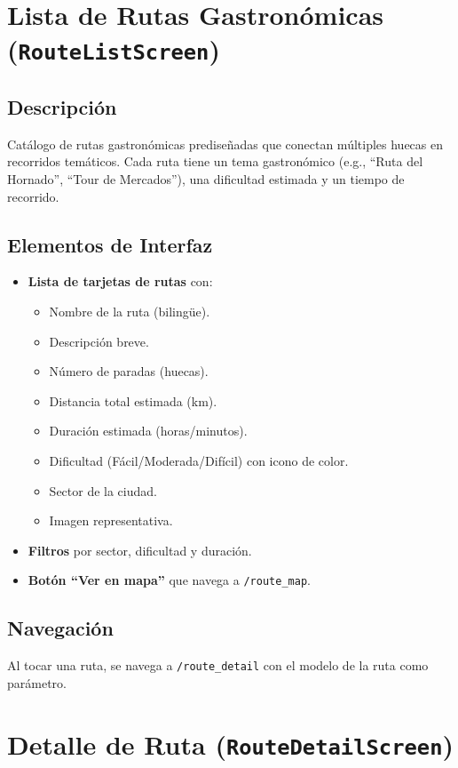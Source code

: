 \documentclass[11pt, a4paper, oneside]{report}
\begin{document}
\section{Lista de Rutas Gastronómicas (\texttt{RouteListScreen})}

\subsection{Descripción}
Catálogo de rutas gastronómicas prediseñadas que conectan múltiples huecas en recorridos temáticos. Cada ruta tiene un tema gastronómico (e.g., ``Ruta del Hornado'', ``Tour de Mercados''), una dificultad estimada y un tiempo de recorrido.

\subsection{Elementos de Interfaz}
\begin{itemize}
  \item \textbf{Lista de tarjetas de rutas} con:
  \begin{itemize}
    \item Nombre de la ruta (bilingüe).
    \item Descripción breve.
    \item Número de paradas (huecas).
    \item Distancia total estimada (km).
    \item Duración estimada (horas/minutos).
    \item Dificultad (Fácil/Moderada/Difícil) con icono de color.
    \item Sector de la ciudad.
    \item Imagen representativa.
  \end{itemize}
  \item \textbf{Filtros} por sector, dificultad y duración.
  \item \textbf{Botón ``Ver en mapa''} que navega a \texttt{/route\_map}.
\end{itemize}

\subsection{Navegación}
Al tocar una ruta, se navega a \texttt{/route\_detail} con el modelo de la ruta como parámetro.

\section{Detalle de Ruta (\texttt{RouteDetailScreen})}
\end{document}
